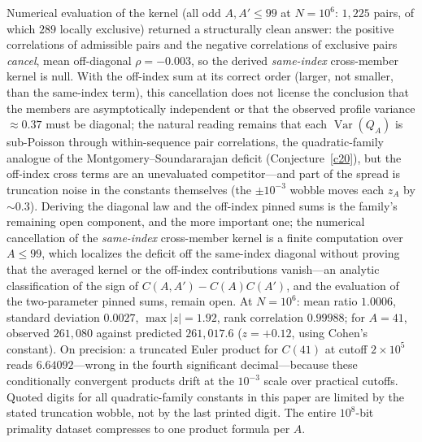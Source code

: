 \documentclass[11pt]{article}
\theoremstyle{definition}
\begin{document}
Numerical evaluation of the kernel (all odd $A,A'\le99$ at
$N=10^6$: $1{,}225$ pairs, of which $289$ locally exclusive) returned
a structurally clean answer: the positive correlations of admissible
pairs and the negative correlations of exclusive pairs \emph{cancel},
mean off-diagonal $\rho=-0.003$, so the derived \emph{same-index}
cross-member kernel is null.  With the off-index sum at its
correct order (larger, not smaller, than the same-index term), this
cancellation does not license the conclusion that the members are
asymptotically independent or that the observed profile variance
${\approx}0.37$ must be diagonal; the natural reading remains that
each
$\operatorname{Var}(Q_A)$ is sub-Poisson through within-sequence pair
correlations, the quadratic-family analogue of the
Montgomery--Soundararajan deficit (Conjecture~\ref{c20}), but the
off-index cross terms are an unevaluated competitor---and part of
the spread is truncation noise in the constants themselves (the
$\pm10^{-3}$ wobble moves each $z_A$ by ${\sim}0.3$).  Deriving the
diagonal law and the off-index pinned sums is the family's remaining
open component, and the more important one; the numerical
cancellation of the \emph{same-index}
cross-member kernel is a finite computation over $A\le99$, which
localizes the deficit off the same-index diagonal without proving
that the averaged kernel or the off-index contributions
vanish---an analytic classification of the sign of
$C(A,A')-C(A)C(A')$, and the evaluation of the two-parameter pinned
sums, remain open.
At $N=10^6$: mean ratio $1.0006$, standard deviation $0.0027$,
$\max|z|=1.92$, rank correlation $0.99988$; for $A=41$, observed
$261{,}080$ against predicted $261{,}017.6$ ($z=+0.12$, using Cohen's
constant).  On precision: a truncated Euler product for $C(41)$ at cutoff
$2\times10^5$ reads
$6.64092$---wrong in the fourth significant decimal---because these
conditionally convergent products drift at the $10^{-3}$ scale over
practical cutoffs.  Quoted digits for all quadratic-family constants in
this paper are limited by the stated truncation wobble, not by the last
printed digit.  The entire
$10^8$-bit primality dataset compresses to one product formula per $A$.
\end{document}
